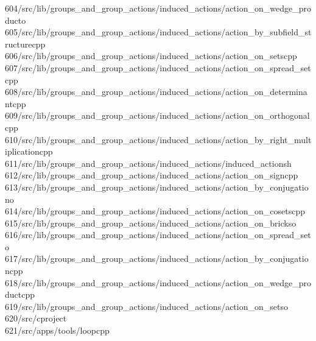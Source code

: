 \begin{tabbing}
604\>/src/lib/groups\_and\_group\_actions/induced\_actions/action\_on\_wedge\_producto\\[0pt]
605\>/src/lib/groups\_and\_group\_actions/induced\_actions/action\_by\_subfield\_structurecpp\\[0pt]
606\>/src/lib/groups\_and\_group\_actions/induced\_actions/action\_on\_setscpp\\[0pt]
607\>/src/lib/groups\_and\_group\_actions/induced\_actions/action\_on\_spread\_setcpp\\[0pt]
608\>/src/lib/groups\_and\_group\_actions/induced\_actions/action\_on\_determinantcpp\\[0pt]
609\>/src/lib/groups\_and\_group\_actions/induced\_actions/action\_on\_orthogonalcpp\\[0pt]
610\>/src/lib/groups\_and\_group\_actions/induced\_actions/action\_by\_right\_multiplicationcpp\\[0pt]
611\>/src/lib/groups\_and\_group\_actions/induced\_actions/induced\_actionsh\\[0pt]
612\>/src/lib/groups\_and\_group\_actions/induced\_actions/action\_on\_signcpp\\[0pt]
613\>/src/lib/groups\_and\_group\_actions/induced\_actions/action\_by\_conjugationo\\[0pt]
614\>/src/lib/groups\_and\_group\_actions/induced\_actions/action\_on\_cosetscpp\\[0pt]
615\>/src/lib/groups\_and\_group\_actions/induced\_actions/action\_on\_brickso\\[0pt]
616\>/src/lib/groups\_and\_group\_actions/induced\_actions/action\_on\_spread\_seto\\[0pt]
617\>/src/lib/groups\_and\_group\_actions/induced\_actions/action\_by\_conjugationcpp\\[0pt]
618\>/src/lib/groups\_and\_group\_actions/induced\_actions/action\_on\_wedge\_productcpp\\[0pt]
619\>/src/lib/groups\_and\_group\_actions/induced\_actions/action\_on\_setso\\[0pt]
620\>/src/cproject\\[0pt]
621\>/src/apps/tools/loopcpp\\[0pt]

\end{tabbing}
